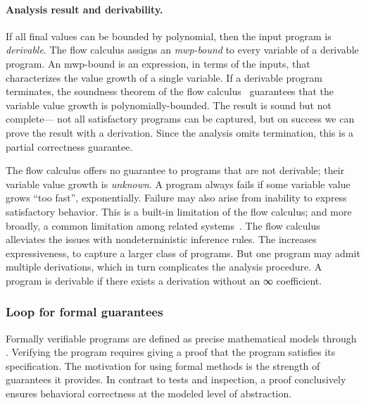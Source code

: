 \paragraph*{Analysis result and derivability.}
If all final values can be bounded by polynomial, then the input program is \emph{derivable}.
The flow calculus assigns an \emph{mwp-bound} to every variable of a derivable program.
An mwp-bound is an expression, in terms of the inputs, that characterizes the value growth of a single variable.
If a derivable program terminates, the soundness theorem of the flow calculus~\cite[p. 11]{jones2009} guarantees that the variable value growth is polynomially-bounded.
The result is sound but not complete---
not all satisfactory programs can be captured, but on success we can prove the result with a derivation.
Since the analysis omits termination, this is a partial correctness guarantee.

The flow calculus offers no guarantee to programs that are not derivable;
their variable value growth is \emph{unknown}.
A program always fails if some variable value grows \enquote{too fast}, \eg exponentially.
Failure may also arise from inability to express satisfactory behavior.
This is a built-in limitation of the flow calculus;
and more broadly, a common limitation among related systems~\cite[p. 2]{baillot2015}.
The flow calculus alleviates the issues with nondeterministic inference rules.
The  increases expressiveness, to capture a larger class of programs.
But one program may admit multiple derivations, which in turn complicates the analysis procedure.
A program is derivable if there exists a derivation without an ∞ coefficient.

\subsubsection{Loop  for formal guarantees}
\label{subsec:specs}

Formally verifiable programs are defined as precise mathematical models through .
Verifying the program requires giving a proof that the program satisfies its specification.
The motivation for using formal methods is the strength of guarantees it provides.
In contrast to tests and inspection, a proof conclusively ensures behavioral correctness at the modeled level of abstraction.

